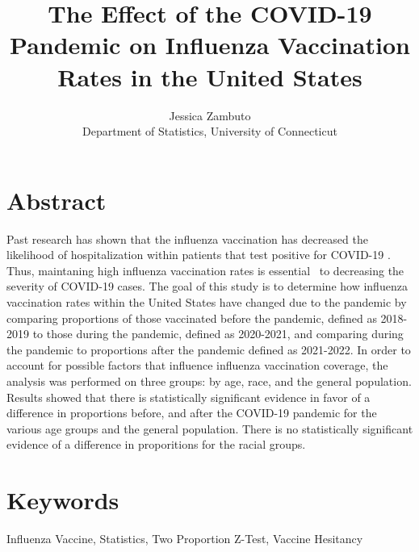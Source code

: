 \documentclass[12pt]{article}
\title{The Effect of the COVID-19 Pandemic on Influenza Vaccination Rates in the United States}
\author{Jessica Zambuto\\
Department of Statistics, University of Connecticut}
\begin{document}
\maketitle
\section*{Abstract}
\label{sec:Abstract}
Past research has shown that the influenza vaccination has decreased the likelihood of hospitalization within patients
that test positive for COVID-19 \citep{conlon2021impact}. Thus, maintaning high influenza vaccination rates is essential \
to decreasing the severity of COVID-19 cases. The goal of this study is to determine how influenza vaccination rates within the
United States have changed due to the pandemic by comparing proportions of those vaccinated before the pandemic, defined as 2018-2019
to those during the pandemic, defined as 2020-2021, and comparing during the pandemic to proportions after the pandemic defined as 2021-2022. 
In order to account for possible factors that influence influenza vaccination coverage, the analysis was performed on three groups: by age,
race, and the general population. Results showed that there is statistically significant evidence in favor of a difference in proportions before,
and after the COVID-19 pandemic for the various age groups and the general population. There is no statistically significant evidence of a difference
in proporitions for the racial groups.

\section*{Keywords}
\label{sec:Keywords}
Influenza Vaccine, Statistics, Two Proportion Z-Test, Vaccine Hesitancy
\end{document}
